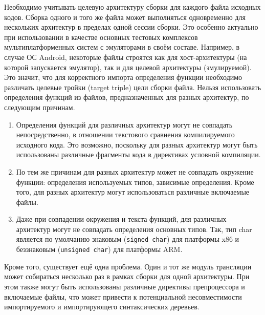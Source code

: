 Необходимо учитывать целевую архитектуру сборки для каждого файла исходных кодов. Сборка одного и того же файла может выполняться одновременно для нескольких архитектур в пределах одной сессии сборки. Это особенно актуально при использовании в качестве основных тестовых комплексов мультиплатформенных систем с эмуляторами в своём составе. Например, в случае ОС Android, некоторые файлы строятся как для хост-архитектуры (на которой запускается эмулятор), так и для целевой архитектуры (эмулируемой). Это значит, что для корректного импорта определения функции необходимо различать целевые тройки (target triple) цели сборки файла. Нельзя использовать определения функций из файлов, предназначенных для разных архитектур, по следующим причинам.

\begin{enumerate}
 \item Определения функций для различных архитектур могут не совпадать непосредственно, в отношении текстового сравнения компилируемого исходного кода. Это возможно, поскольку для разных архитектур могут быть использованы различные фрагменты кода в директивах условной компиляции.
 \item По тем же причинам для разных архитектур может не совпадать окружение функции: определения используемых типов, зависимые определения. Кроме того, для разных архитектур могут использоваться различные включаемые файлы.
 \item Даже при совпадении окружения и текста функций, для различных архитектур могут не совпадать определения основных типов. Так, тип char является по умолчанию знаковым (\texttt{signed char}) для платформы x86 и беззнаковым (\texttt{unsigned char}) для платформы ARM.
\end{enumerate}

Кроме того, существует ещё одна проблема. Один и тот же модуль трансляции может собираться несколько раз в рамках сборки для одной архитектуры. При этом также могут быть использованы различные директивы препроцессора и включаемые файлы, что может привести к потенциальной несовместимости импортируемого и импортирующего синтаксических деревьев.

